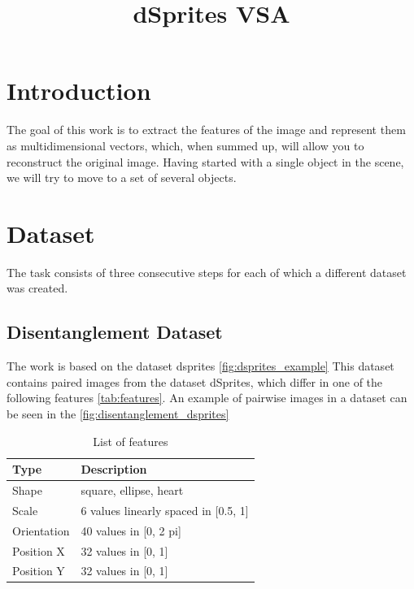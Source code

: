 \documentclass{article}
\title{dSprites VSA}
\author{ }
\date{ }
\begin{document}
    \maketitle


    \section{Introduction}

    The goal of this work is to extract the features of the image
    and represent them as multidimensional vectors, which, when
    summed up, will allow you to reconstruct the original image.
    Having started with a single object in the scene, we will try
    to move to a set of several objects.


    \section{Dataset}

    The task consists of three consecutive steps for each of
    which a different dataset was created.

    \subsection{Disentanglement Dataset}
    The work is based on the dataset dsprites \autoref{fig:dsprites_example}
    This dataset contains paired images from the dataset
    dSprites, which differ in one of the following features \autoref{tab:features}.
    An example of pairwise images in a dataset can be seen in the \autoref{fig:disentanglement_dsprites}

    \begin{table}[ht]
        \centering
        \caption{List of features}
        \label{tab:features}
        \begin{tabular}[t]{ll}
            \hline
            Type        & Description                          \\
            \hline
            Shape       & square, ellipse, heart               \\
            Scale       & 6 values linearly spaced in [0.5, 1] \\
            Orientation & 40 values in [0, 2 pi]               \\
            Position X  & 32 values in [0, 1]                  \\
            Position Y  & 32 values in [0, 1]                  \\
            \hline
        \end{tabular}
    \end{table}
\end{document}
